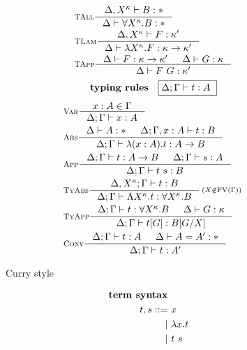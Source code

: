 \begin{figure}
\begin{singlespace}
\begin{minipage}{.46\textwidth}
\begin{align*}
& \inference[\sc TAll]{\Delta,X^\kappa |- B:*}
                      {\Delta |- \forall X^\kappa.B:*} \\
& \inference[\sc TLam]{\Delta,X^\kappa |- F:\kappa'}
                      {\Delta |- \l X^\kappa.F:\kappa -> \kappa'} \\
& \inference[\sc TApp]{\Delta |- F : \kappa -> \kappa' & \Delta |- G : \kappa}
                      {\Delta |- F ~ G : \kappa'} \\
\end{align*}
\[ \textbf{typing rules} \quad \framebox{$ \Delta;\Gamma |- t : A $ } \]
\vspace*{-1em}
\begin{align*}
& \inference[\sc Var]{x:A \in \Gamma}{\Delta;\Gamma |- x:A} \\
& \inference[\sc Abs]{\Delta |- A:* & \Delta;\Gamma,x:A |- t : B}
                     {\Delta;\Gamma |- \l(x:A).t : A -> B} \\
& \inference[\sc App]{\Delta;\Gamma |- t : A -> B & \Delta;\Gamma |- s : A}
                     {\Delta;\Gamma |- t~s : B} \\
& \inference[\sc TyAbs]{\Delta,X^\kappa;\Gamma |- t : B}
                       {\Delta;\Gamma |- \L X^\kappa.t : \forall X^\kappa.B}
	 \begin{smallmatrix}(X\notin\FV(\Gamma))\end{smallmatrix} \\
& \inference[\sc TyApp]{\Delta;\Gamma |- t : \forall X^\kappa.B & \Delta |- G:\kappa}
                       {\Delta;\Gamma |- t[G] : B[G/X]} \\
& \inference[\sc Conv]{\Delta;\Gamma |- t : A & \Delta |- A = A' : *}
                      {\Delta;\Gamma |- t : A'}
\end{align*}
\end{minipage}
\begin{minipage}{.46\textwidth}
        \begin{center}Curry style\end{center}\vspace*{-1em}
\def\baselinestretch{0}
\small
\begin{align*}
\textbf{term syntax} \\
t,s ::= &~ x           \\
      | &~ \l x    . t \\
      | &~ t ~ s       \\
      \phantom{|} &~ \\
      \phantom{|} &~ \\

\end{align*}
\end{minipage}
\end{singlespace}
\end{figure}
